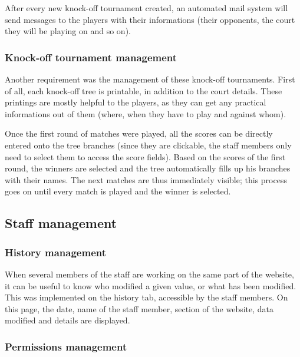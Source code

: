 After every new knock-off tournament created, an automated mail system will
send messages to the players with their informations (their opponents, the
court they will be playing on and so on).

\subsubsection{Knock-off tournament management}
\label{subs:Knock-off tournament management}


Another requirement was the management of these knock-off tournaments. First of
all, each knock-off tree is printable, in addition to the court details. These
printings are mostly helpful to the players, as they can get any practical
informations out of them (where, when they have to play and against whom). \newline

Once the first round of matches were played, all the scores can be directly
entered onto the tree branches (since they are clickable, the staff members
only need to select them to access the score fields). Based on the scores of
the first round, the winners are selected and the tree automatically fills up
his branches with their names. The next matches are thus immediately visible;
this process goes on until every match is played and the winner is selected.

\subsection{Staff management}
\label{sub:Staff management}

\subsubsection{History management}
\label{subs:History management}


When several members of the staff are working on the same part of the website,
it can be useful to know who modified a given value, or what has been modified.
This was implemented on the history tab, accessible by the staff members. On
this page, the date, name of the staff member, section of the website, data
modified and details are displayed.

\subsubsection{Permissions management}
\label{subs:Permissions management}

